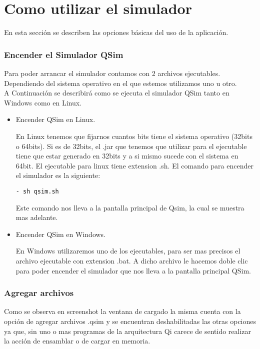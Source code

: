 \section{Como utilizar el simulador}

En esta sección se describen las opciones básicas del uso de la aplicación.

\subsubsection{Encender el Simulador QSim}
Para poder arrancar el simulador contamos con 2 archivos ejecutables. 
Dependiendo del sistema operativo en el que estemos utilizamos uno u otro.\\

A Continuación se describirá como se ejecuta el simulador QSim tanto en Windows como en Linux.
\begin{itemize}

\item Encender QSim en Linux.

En Linux tenemos que fijarnos cuantos bits tiene el sistema operativo (32bits o 64bits). Si es de 32bits, el .jar que tenemos que utilizar para el ejecutable tiene que estar generado en 32bits y a si mismo sucede con el sistema en 64bit. El ejecutable para linux tiene extension .sh. El comando para encender el simulador es la siguiente:

\begin{verbatim}
- sh qsim.sh
\end{verbatim}

Este comando nos lleva a la pantalla principal de Qsim, la cual se muestra mas adelante.
\item Encender QSim en Windows.

En Windows utilizaremos uno de los ejecutables, para ser mas precisos el archivo ejecutable con extension .bat.
A dicho archivo le hacemos doble clic para poder encender el simulador que nos lleva a la pantalla principal QSim.

 
\end{itemize}

\subsubsection{Agregar archivos}
Como se observa en screenshot la ventana de cargado la misma cuenta con la opción de agregar archivos .qsim y se encuentran deshabilitadas las otras opciones ya que, sin uno o mas programas de la arquitectura Qi carece de sentido realizar la acción de ensamblar o de cargar en memoria.

